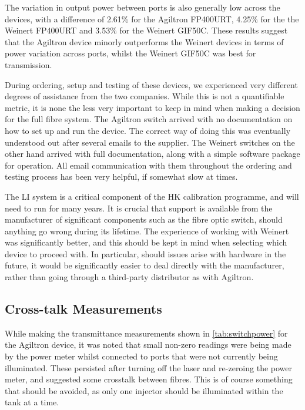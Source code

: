 \documentclass[a4paper,11pt]{article}
\begin{document}
The variation in output power between ports is also generally low across the devices, with a difference of 2.61\% for the Agiltron FP400URT, 4.25\% for the the Weinert FP400URT and 3.53\% for the Weinert GIF50C. These results suggest that the Agiltron device minorly outperforms the Weinert devices in terms of power variation across ports, whilst the Weinert GIF50C was best for transmission.

During ordering, setup and testing of these devices, we experienced very different degrees of assistance from the two companies. While this is not a quantifiable metric, it is none the less very important to keep in mind when making a decision for the full fibre system. The Agiltron switch arrived with no documentation on how to set up and run the device. The correct way of doing this was eventually understood out after several emails to the supplier. The Weinert switches on the other hand arrived with full documentation, along with a simple software package for operation. All email communication with them throughout the ordering and testing process has been very helpful, if somewhat slow at times.

The LI system is a critical component of the HK calibration programme, and will need to run for many years. It is crucial that support is available from the manufacturer of significant components such as the fibre optic switch, should anything go wrong during its lifetime. The experience of working with Weinert was significantly better, and this should be kept in mind when selecting which device to proceed with. In particular, should issues arise with hardware in the future, it would be significantly easier to deal directly with the manufacturer, rather than going through a third-party distributor as with Agiltron.


\subsection{Cross-talk Measurements}

While making the transmittance measurements shown in \cref{tab:switchpower} for the Agiltron device, it was noted that small non-zero readings were being made by the power meter whilst connected to ports that were not currently being illuminated. These persisted after turning off the laser and re-zeroing the power meter, and suggested some crosstalk between fibres. This is of course something that should be avoided, as only one injector should be illuminated within the tank at a time.
\end{document}
